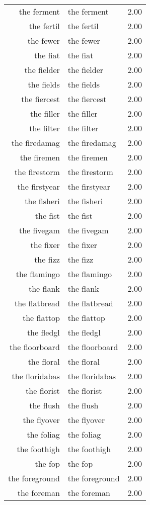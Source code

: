 \begin{table}[ht]
\begin{tabular}{rlr}
  the ferment & the ferment & 2.00 \\ 
  the fertil & the fertil & 2.00 \\ 
  the fewer & the fewer & 2.00 \\ 
  the fiat & the fiat & 2.00 \\ 
  the fielder & the fielder & 2.00 \\ 
  the fields & the fields & 2.00 \\ 
  the fiercest & the fiercest & 2.00 \\ 
  the filler & the filler & 2.00 \\ 
  the filter & the filter & 2.00 \\ 
  the firedamag & the firedamag & 2.00 \\ 
  the firemen & the firemen & 2.00 \\ 
  the firestorm & the firestorm & 2.00 \\ 
  the firstyear & the firstyear & 2.00 \\ 
  the fisheri & the fisheri & 2.00 \\ 
  the fist & the fist & 2.00 \\ 
  the fivegam & the fivegam & 2.00 \\ 
  the fixer & the fixer & 2.00 \\ 
  the fizz & the fizz & 2.00 \\ 
  the flamingo & the flamingo & 2.00 \\ 
  the flank & the flank & 2.00 \\ 
  the flatbread & the flatbread & 2.00 \\ 
  the flattop & the flattop & 2.00 \\ 
  the fledgl & the fledgl & 2.00 \\ 
  the floorboard & the floorboard & 2.00 \\ 
  the floral & the floral & 2.00 \\ 
  the floridabas & the floridabas & 2.00 \\ 
  the florist & the florist & 2.00 \\ 
  the flush & the flush & 2.00 \\ 
  the flyover & the flyover & 2.00 \\ 
  the foliag & the foliag & 2.00 \\ 
  the foothigh & the foothigh & 2.00 \\ 
  the fop & the fop & 2.00 \\ 
  the foreground & the foreground & 2.00 \\ 
  the foreman & the foreman & 2.00 \\ 

\end{tabular}
\end{table}
